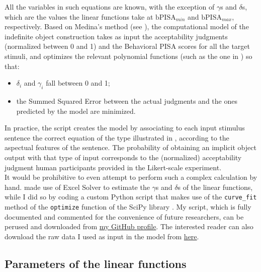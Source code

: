 All the variables in such equations are known, with the exception of $\gamma$s and $\delta$s, which are the values the linear functions take at $\textrm{bPISA}_{min}$ and $\textrm{bPISA}_{max}$, respectively. Based on Medina's method (see ), the computational model of the indefinite object construction takes as input the acceptability judgments (normalized between 0 and 1) and the Behavioral PISA scores for all the target stimuli, and optimizes the relevant polynomial functions (such as the one in ) so that:

\begin{itemize}
    \item $\delta_i$ and $\gamma_i$ fall between 0 and 1;
    \item the Summed Squared Error between the actual judgments and the ones predicted by the model are minimized.
\end{itemize}

In practice, the script creates the model by associating to each input stimulus sentence the correct equation of the type illustrated in , according to the aspectual features of the sentence. The probability of obtaining an implicit object output with that type of input corresponds to the (normalized) acceptability judgment human participants provided in the Likert-scale experiment.\\
It would be prohibitive to even attempt to perform such a complex calculation by hand. \textcite[135]{Medina2007} made use of Excel Solver to estimate the $\gamma$s and $\delta$s of the linear functions, while I did so by coding a custom Python script that makes use of the \texttt{curve\_fit} method of the \texttt{optimize} function of the SciPy library \parencite{2020SciPy-NMeth}. My script, which is fully documented and commented for the convenience of future researchers, can be perused and downloaded from \href{https://github.com/giuliacappelli/MedinaStochasticOptimalityTheory}{my GitHub profile}. The interested reader can also download the raw data I used as input in the model from \href{https://github.com/giuliacappelli/dissertationData}{here}.


\subsection{Parameters of the linear functions} 

